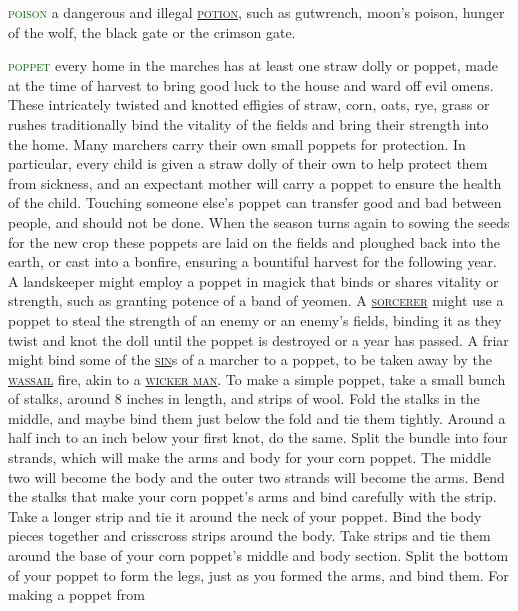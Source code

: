 \documentclass[twoside,11pt,b5paper,twocolumn]{scrbook}
\newcommand{\estcab}[1]{\textsc{\textcolor{marron}{#1}}}
\renewcommand{\paragraph}[1]{\par\noindent\markboth{#1}{#1}\estcab{\textcolor{darkgreen}{#1}}\label{#1} }
\newcommand{\see}[1]{{\estcab{\hyperref[#1]{#1}}}}
\begin{document}
\paragraph{poison} a dangerous and illegal \see{potion}, such as gutwrench, moon's poison, hunger of the wolf, the black gate or the crimson gate.
\paragraph{poppet} every home in the marches has at least one straw dolly or poppet, made at the time of harvest to bring good luck to the house and ward off evil omens. These intricately twisted and knotted effigies of straw, corn, oats, rye, grass or rushes traditionally bind the vitality of the fields and bring their strength into the home. Many marchers carry their own small poppets for protection. In particular, every child is given a straw dolly of their own to help protect them from sickness, and an expectant mother will carry a poppet to ensure the health of the child. Touching someone else’s poppet can transfer good and bad between people, and should not be done. When the season turns again to sowing the seeds for the new crop these poppets are laid on the fields and ploughed back into the earth, or cast into a bonfire, ensuring a bountiful harvest for the following year. A landskeeper might employ a poppet in magick that binds or shares vitality or strength, such as granting potence of a band of yeomen. A \see{sorcerer} might use a poppet to steal the strength of an enemy or an enemy's fields, binding it as they twist and knot the doll until the poppet is destroyed or a year has passed. A friar might bind some of the \see{sin}s of a marcher to a poppet, to be taken away by the \see{wassail} fire, akin to a \see{wicker man}. To make a simple poppet, take a small bunch of stalks, around 8 inches in length, and strips of wool. Fold the stalks in the middle, and maybe bind them just below the fold and tie them tightly. Around a half inch to an inch below your first knot, do the same. Split the bundle into four strands, which will make the arms and body for your corn poppet. The middle two will become the body and the outer two strands will become the arms. Bend the stalks that make your corn poppet’s arms and bind carefully with the strip. Take a longer strip and tie it around the neck of your poppet. Bind the body pieces together and crisscross strips around the body. Take strips and tie them around the base of your corn poppet’s middle and body section. Split the bottom of your poppet to form the legs, just as you formed the arms, and bind them. For making a poppet from 
\end{document}
